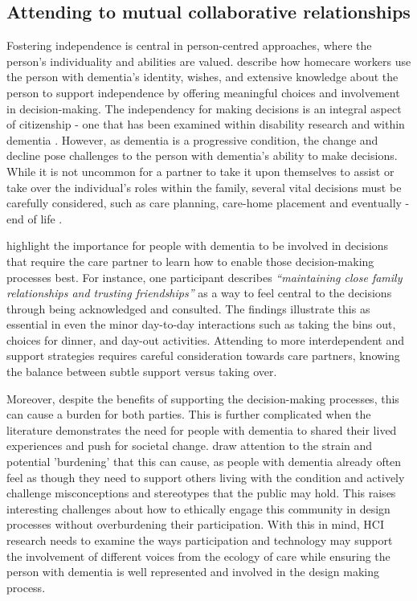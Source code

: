 \subsection{Attending to mutual collaborative relationships}
\label{BL:gap:relationships}
Fostering independence is central in person-centred approaches, where the person's individuality and abilities are valued. \cite{leverton2021supporting} describe how homecare workers use the person with dementia's identity, wishes, and extensive knowledge about the person to support independence by offering meaningful choices and involvement in decision-making. The independency for making decisions is an integral aspect of citizenship - one that has been examined within disability research and within dementia \citep{meissner_-it-yourself_2017,samsi_everyday_2013}. However, as dementia is a progressive condition, the change and decline pose challenges to the person with dementia's ability to make decisions. While it is not uncommon for a partner to take it upon themselves to assist or take over the individual's roles within the family, several vital decisions must be carefully considered, such as care planning, care-home placement and eventually - end of life \citep{fetherstonhaugh_decision-making_2017}.

\cite{fetherstonhaugh2013being} highlight the importance for people with dementia to be involved in decisions that require the care partner to learn how to enable those decision-making processes best. For instance, one participant describes \textit{``maintaining close family relationships and trusting friendships''} as a way to feel central to the decisions through being acknowledged and consulted. The findings illustrate this as essential in even the minor day-to-day interactions such as taking the bins out, choices for dinner, and day-out activities. Attending to more interdependent and support strategies requires careful consideration towards care partners, knowing the balance between subtle support versus taking over.

Moreover, despite the benefits of supporting the decision-making processes, this can cause a burden for both parties. This is further complicated when the literature demonstrates the need for people with dementia to shared their lived experiences and push for societal change. \citep{johnson_older_2019} draw attention to the strain and potential 'burdening' that this can cause, as people with dementia already often feel as though they need to support others living with the condition and actively challenge misconceptions and stereotypes that the public may hold. This raises interesting challenges about how to ethically engage this community in design processes without overburdening their participation. With this in mind, HCI research needs to examine the ways participation and technology may support the involvement of different voices from the ecology of care while ensuring the person with dementia is well represented and involved in the design making process. 


